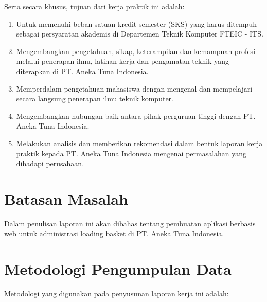 Serta secara khusus, tujuan dari kerja praktik ini adalah:
\vspace{0.5ex}

\begin{enumerate}[nolistsep]

  \item Untuk memenuhi beban satuan kredit semester (SKS) yang harus ditempuh sebagai persyaratan akademis di Departemen Teknik Komputer FTEIC - ITS.
  \vspace{0.5ex}

  \item Mengembangkan pengetahuan, sikap, keterampilan dan kemampuan profesi melalui penerapan ilmu, latihan kerja dan pengamatan teknik yang diterapkan di PT. Aneka Tuna Indonesia.
  \vspace{0.5ex}

  \item Memperdalam pengetahuan mahasiswa dengan mengenal dan mempelajari secara langsung penerapan ilmu teknik komputer.
  \vspace{0.5ex}

  \item Mengembangkan hubungan baik antara pihak perguruan tinggi dengan PT. Aneka Tuna Indonesia.
  \vspace{0.5ex}

  \item Melakukan analisis dan memberikan rekomendasi dalam bentuk laporan kerja praktik kepada PT. Aneka Tuna Indonesia mengenai permasalahan yang dihadapi perusahaan.

\end{enumerate}
\vspace{0.5ex}

\section{Batasan Masalah}
\vspace{1ex}

Dalam penulisan laporan ini akan dibahas tentang pembuatan aplikasi berbasis web untuk administrasi loading basket di PT. Aneka Tuna Indonesia.
\vspace{0.5ex}

\section{Metodologi Pengumpulan Data}
\vspace{1ex}

Metodologi yang digunakan pada penyusunan laporan kerja ini adalah:
\vspace{0.5ex}

